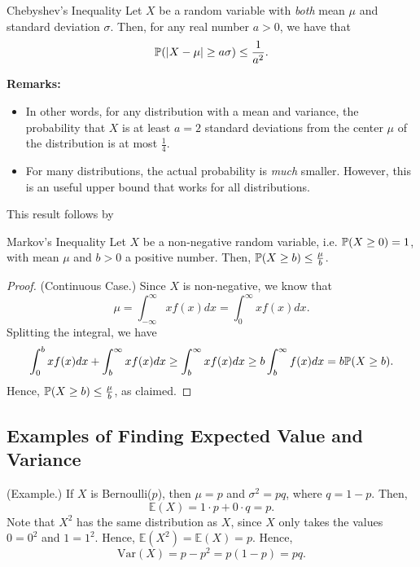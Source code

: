 \begin{theorem}{Chebyshev's Inequality}{}
    Let $X$ be a random variable with \emph{both} mean $\mu$ and standard deviation $\sigma$. Then, for any real number $a > 0$, we have that 
    \[\mathbb{P}(|X - \mu| \geq a \sigma) \leq \frac{1}{a^2}.\]
\end{theorem}
\textbf{Remarks:}
\begin{itemize}
    \item In other words, for any distribution with a mean and variance, the probability that $X$ is at least $a = 2$ standard deviations from the center $\mu$ of the distribution is at most $\frac{1}{4}$.
    \item For many distributions, the actual probability is \emph{much} smaller. However, this is an useful upper bound that works for all distributions.
\end{itemize}
This result follows by 
\begin{theorem}{Markov's Inequality}{}
    Let $X$ be a non-negative random variable, i.e. $\mathbb{P}(X \geq 0) = 1$, with mean $\mu$ and $b > 0$ a positive number. Then, $\mathbb{P}(X \geq b) \leq \frac{\mu}{b}$. 
\end{theorem}

\begin{mdframed}[]
    \begin{proof}
        (Continuous Case.) Since $X$ is non-negative, we know that 
        \[\mu = \int_{-\infty}^{\infty} xf(x) dx = \int_0^{\infty} xf(x) dx.\]
        Splitting the integral, we have 
        \[\int_{0}^{b} xf(x) dx + \int_{b}^{\infty} xf(x) dx \geq \int_{b}^{\infty} xf(x) dx \geq b \int_{b}^{\infty} f(x) dx = b \mathbb{P}(X \geq b).\]
        Hence, $\mathbb{P}(X \geq b) \leq \frac{\mu}{b}$, as claimed.
    \end{proof}
\end{mdframed}

\subsection{Examples of Finding Expected Value and Variance}

\begin{mdframed}[]
    (Example.) If $X$ is Bernoulli($p$), then $\mu = p$ and $\sigma^2 = pq$, where $q = 1 - p$. Then, 
    \[\mathbb{E}(X) = 1 \cdot p + 0 \cdot q = p.\]
    Note that $X^2$ has the same distribution as $X$, since $X$ only takes the values $0 = 0^2$ and $1 = 1^2$. Hence, $\mathbb{E}(X^2) = \mathbb{E}(X) = p$. Hence, 
    \[\text{Var}(X) = p - p^2 = p(1 - p) = pq.\]
\end{mdframed}

